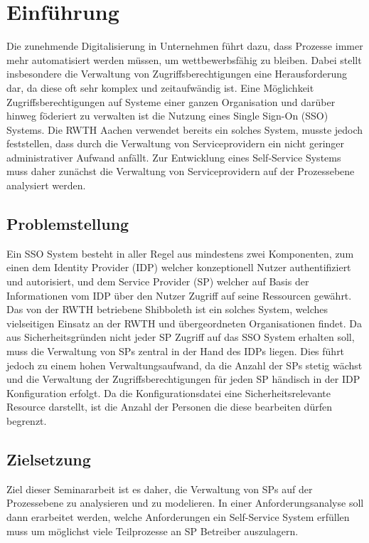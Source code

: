 \documentclass[11pt,a4paper]{scrartcl}
\begin{document}


\tableofcontents
\newpage


\section{Einführung}\label{sec:einfuehrung}
Die zunehmende Digitalisierung in Unternehmen führt dazu, dass Prozesse immer mehr automatisiert werden müssen, um wettbewerbsfähig zu bleiben.
Dabei stellt insbesondere die Verwaltung von Zugriffsberechtigungen eine Herausforderung dar, da diese oft sehr komplex und zeitaufwändig ist.
Eine Möglichkeit Zugriffsberechtigungen auf Systeme einer ganzen Organisation und darüber hinweg föderiert zu verwalten ist die Nutzung eines Single Sign-On (SSO) Systems.
Die RWTH Aachen verwendet bereits ein solches System, musste jedoch feststellen, dass durch die Verwaltung von Serviceprovidern ein nicht geringer administrativer Aufwand anfällt.
Zur Entwicklung eines Self-Service Systems muss daher zunächst die Verwaltung von Serviceprovidern auf der Prozessebene analysiert werden.

\subsection{Problemstellung}\label{subsec:problemstellung}
Ein SSO System besteht in aller Regel aus mindestens zwei Komponenten, zum einen dem Identity Provider (IDP) welcher konzeptionell Nutzer authentifiziert und autorisiert, und dem Service Provider (SP) welcher auf Basis der Informationen vom IDP über den Nutzer Zugriff auf seine Ressourcen gewährt.
Das von der RWTH betriebene Shibboleth ist ein solches System, welches vielseitigen Einsatz an der RWTH und übergeordneten Organisationen findet.
Da aus Sicherheitsgründen nicht jeder SP Zugriff auf das SSO System erhalten soll, muss die Verwaltung von SPs zentral in der Hand des IDPs liegen. 
Dies führt jedoch zu einem hohen Verwaltungsaufwand, da die Anzahl der SPs stetig wächst und die Verwaltung der Zugriffsberechtigungen für jeden SP händisch in der IDP Konfiguration erfolgt.
Da die Konfigurationsdatei eine Sicherheitsrelevante Resource darstellt, ist die Anzahl der Personen die diese bearbeiten dürfen begrenzt.

\subsection{Zielsetzung}\label{subsec:zielsetzung}
Ziel dieser Seminararbeit ist es daher, die Verwaltung von SPs auf der Prozessebene zu analysieren und zu modelieren.
In einer Anforderungsanalyse soll dann erarbeitet werden, welche Anforderungen ein Self-Service System erfüllen muss um möglichst viele Teilprozesse an SP Betreiber auszulagern.
\end{document}
